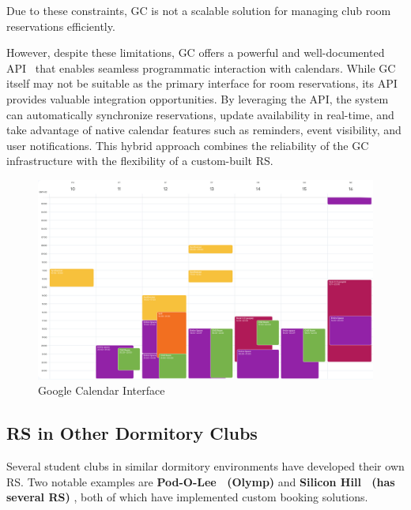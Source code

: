 Due to these constraints, GC is not a scalable solution for managing club room reservations efficiently.

However, despite these limitations, GC offers a powerful and well-documented API~\cite{googleCalendarAPI} that enables seamless programmatic interaction with calendars. While GC itself may not be suitable as the primary interface for room reservations, its API provides valuable integration opportunities. By leveraging the API, the system can automatically synchronize reservations, update availability in real-time, and take advantage of native calendar features such as reminders, event visibility, and user notifications. This hybrid approach combines the reliability of the GC infrastructure with the flexibility of a custom-built RS.

\begin{figure}[!htbp]
  \centering
  \includegraphics[width=\linewidth]{images/google-calendar}
  \caption{Google Calendar Interface~\cite{googleCalendar}}
  \label{fig:GoogleCalendar}
\end{figure}

\subsection{RS in Other Dormitory Clubs}

Several student clubs in similar dormitory environments have developed their own RS. Two notable examples are \textbf{Pod-O-Lee~\cite{SUPodOLee} (Olymp)} and \textbf{Silicon Hill~\cite{SUSiliconHill} (has several RS)} , both of which have implemented custom booking solutions.

